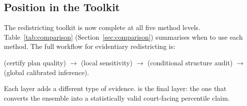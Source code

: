 \subsection{Position in the Toolkit}

The redistricting toolkit is now complete at all five method levels.
Table~\ref{tab:comparison} (Section~\ref{sec:comparison}) summarises when
to use each method.
The full workflow for evidentiary redistricting is:
\begin{center}
  \cs{} (certify plan quality) $\to$ \flip{} (local sensitivity)
  $\to$ \be{} (conditional structure audit)
  $\to$ \smc{} (global calibrated inference).
\end{center}
Each layer adds a different type of evidence.
\smc{} is the final layer: the one that converts the ensemble into a
statistically valid court-facing percentile claim.
